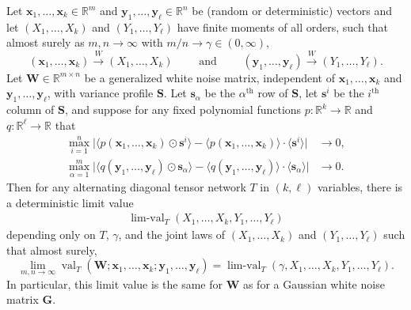 \documentclass[10pt,reqno]{amsart}
\def\a{\alpha}
\def\s{\mathbf{s}}
\def\x{\mathbf{x}}
\def\y{\mathbf{y}}
\def\W{\mathbf{W}}
\def\S{\mathbf{S}}
\def\G{\mathbf{G}}
\def\R{\mathbb{R}}
\def\val{\operatorname{val}}
\def\limval{\operatorname{lim-val}}
\def\toW{\overset{W}{\to}}
\begin{document}
\begin{lemma}\label{lemma:rectmoments}
Let $\x_1,\ldots,\x_k \in \R^m$ and $\y_1,\ldots,\y_\ell \in \R^n$ be (random or
deterministic) vectors and let $(X_1,\ldots,X_k)$ and $(Y_1,\ldots,Y_\ell)$ have
finite moments of all orders, such that almost surely as $m,n \to \infty$
with $m/n \to \gamma \in (0,\infty)$,
\[(\x_1,\ldots,\x_k) \toW (X_1,\ldots,X_k) \qquad \text{ and } 
\qquad (\y_1,\ldots,\y_\ell) \toW (Y_1,\ldots,Y_\ell).\]
Let $\W \in \R^{m \times n}$ be a generalized white noise matrix,
independent of $\x_1,\ldots,\x_k$ and $\y_1,\ldots,\y_\ell$, with variance
profile $\S$. Let $\s_\a$ be the $\a^\text{th}$ row of $\S$, let
$\s^i$ be the $i^\text{th}$ column of $\S$, and suppose for any fixed polynomial
functions $p:\R^k \to \R$ and $q:\R^\ell \to \R$ that
\begin{align}
\max_{i=1}^n \Big| \langle p(\x_1,\ldots,\x_k) \odot \s^i \rangle
-\langle p(\x_1,\ldots,\x_k) \rangle \cdot \langle \s^i \rangle \Big| &\to 0,
\label{eq:rectpsavg}\\
\max_{\a=1}^m \Big| \langle q(\y_1,\ldots,\y_\ell) \odot \s_\a \rangle
-\langle q(\y_1,\ldots,\y_\ell) \rangle \cdot \langle \s_\a \rangle \Big| &\to
0.\label{eq:rectqsavg}
\end{align}
Then for any alternating diagonal tensor network $T$ in $(k,\ell)$ variables,
there is a deterministic limit value
\begin{align*}
    \limval_T(X_1,\ldots,X_k,Y_1,\ldots,Y_\ell)
\end{align*}
depending only on $T$, $\gamma$, and the joint laws of $(X_1,\ldots,X_k)$ and
$(Y_1,\ldots,Y_\ell)$ such that almost surely,
\[\lim_{m,n \to \infty} \val_T(\W;\x_1,\ldots,\x_k;\y_1,\ldots,\y_\ell)
=\limval_T(\gamma,X_1,\ldots,X_k,Y_1,\ldots,Y_\ell).\]
In particular, this limit value is the same for $\W$ as for a Gaussian white
noise matrix $\G$.
\end{lemma}
\end{document}
